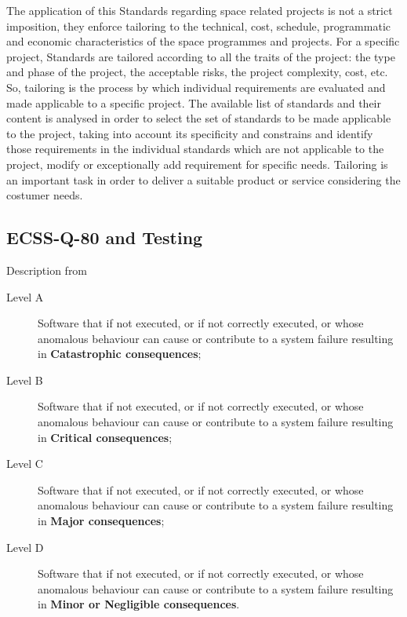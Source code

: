 {The application of this Standards regarding space related projects is not a strict imposition, they enforce
tailoring to the technical, cost, schedule, programmatic and economic characteristics of the space programmes and projects.
For a specific project, Standards are tailored according to all the traits of the project: the type and 
phase of the project, the acceptable risks, the project complexity, cost, etc.
So, tailoring is the process by which individual requirements are evaluated and made applicable to a specific project.
The available list of standards and their content is analysed in order to select the set of standards to be made applicable to the project, taking 
into account its specificity and constrains and identify those requirements in the individual standards which are not 
applicable to the project, modify or exceptionally add requirement for specific needs\cite{ecss-s-st-00c}.
Tailoring is an important task in order to deliver a suitable product or service considering the costumer needs.

\subsection{ECSS-Q-80 and Testing}
Description from\cite{ecss-q-st-80c}
\begin{description}
\item[Level A] Software that if not executed, or if not correctly executed, or whose anomalous behaviour can cause or contribute to a system failure resulting in \textbf{Catastrophic consequences};
\item[Level B] Software that if not executed, or if not correctly executed, or whose anomalous behaviour can cause or contribute to a system failure resulting in \textbf{Critical consequences};
\item[Level C] Software that if not executed, or if not correctly executed, or whose anomalous behaviour can cause or contribute to a system failure resulting in \textbf{Major consequences};
\item[Level D] Software that if not executed, or if not correctly executed, or whose anomalous behaviour can cause or contribute to a system failure resulting in \textbf{Minor or Negligible consequences}.
\end{description}

}
